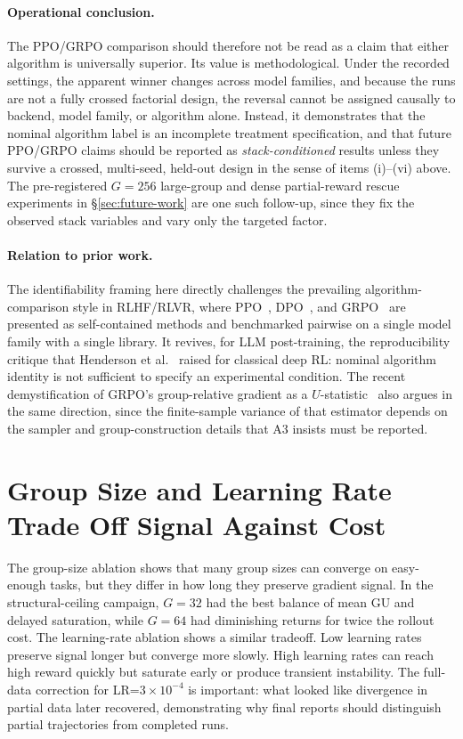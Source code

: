 \documentclass[12pt,a4paper]{report}
\begin{document}
\paragraph{Operational conclusion.}
The PPO/GRPO comparison should therefore not be read as a claim that either algorithm is universally superior. Its value is methodological. Under the recorded settings, the apparent winner changes across model families, and because the runs are not a fully crossed factorial design, the reversal cannot be assigned causally to backend, model family, or algorithm alone. Instead, it demonstrates that the nominal algorithm label is an incomplete treatment specification, and that future PPO/GRPO claims should be reported as \emph{stack-conditioned} results unless they survive a crossed, multi-seed, held-out design in the sense of items (i)--(vi) above. The pre-registered $G\!=\!256$ large-group and dense partial-reward rescue experiments in \S\ref{sec:future-work} are one such follow-up, since they fix the observed stack variables and vary only the targeted factor.

\paragraph{Relation to prior work.}
The identifiability framing here directly challenges the prevailing algorithm-comparison style in RLHF/RLVR, where PPO~\citep{schulman2017proximal}, DPO~\citep{rafailov2024direct}, and GRPO~\citep{shao2024deepseekmath} are presented as self-contained methods and benchmarked pairwise on a single model family with a single library. It revives, for LLM post-training, the reproducibility critique that Henderson et al.~\citep{henderson2018deep} raised for classical deep RL: nominal algorithm identity is not sufficient to specify an experimental condition. The recent demystification of GRPO's group-relative gradient as a $U$-statistic~\citep{zhou2026demystify} also argues in the same direction, since the finite-sample variance of that estimator depends on the sampler and group-construction details that A3 insists must be reported.

\section{Group Size and Learning Rate Trade Off Signal Against Cost}
\label{sec:g-lr}

The group-size ablation shows that many group sizes can converge on easy-enough tasks, but they differ in how long they preserve gradient signal. In the structural-ceiling campaign, $G=32$ had the best balance of mean GU and delayed saturation, while $G=64$ had diminishing returns for twice the rollout cost. The learning-rate ablation shows a similar tradeoff. Low learning rates preserve signal longer but converge more slowly. High learning rates can reach high reward quickly but saturate early or produce transient instability. The full-data correction for LR=$3\times 10^{-4}$ is important: what looked like divergence in partial data later recovered, demonstrating why final reports should distinguish partial trajectories from completed runs.
\end{document}
